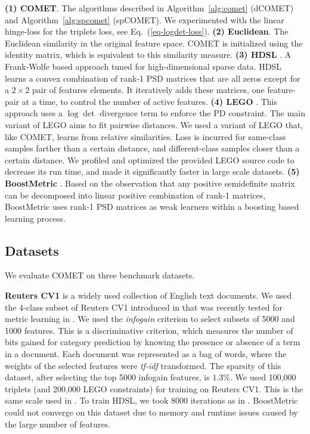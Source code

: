 \documentclass[twoside,11pt]{article}
\renewcommand{\eqref}[1]{Eq.~(\ref{#1})}
\begin{document}
\textbf{(1) COMET}. The algorithms described in Algorithm~\ref{alg:comet} (dCOMET) and Algorithm~\ref{alg:spcomet} (spCOMET). We experimented with the linear hinge-loss for the triplets loss, see \eqref{eq-logdet-loss}. \textbf{(2) Euclidean}. The Euclidean similarity in the original feature space. COMET is initialized using the identity matrix, which is equivalent to this similarity measure.  \textbf{(3) HDSL} \citep{HDSL}. A Frank-Wolfe based approach tuned for high-dimensional sparse data. HDSL learns a convex combination of rank-1 PSD matrices that are all zeros except for a $2\times2$ pair of features elements. It iteratively adds these matrices, one feature-pair at a time, to control the number of active features. \textbf{(4) LEGO} \citep{lego}. This approach uses a $\log \det$ divergence term to enforce the PD constraint. The main variant of LEGO aims to fit pairwise distances. We used a variant of LEGO that, like COMET, learns from relative similarities. Loss is incurred for same-class samples farther than a certain distance, and different-class samples closer than a certain distance. We profiled and optimized the provided LEGO source code to decrease its run time, and made it significantly faster in large scale datasets. \textbf{(5) BoostMetric} \citep{boost}. Based on the observation that any positive semidefinite matrix can be decomposed into linear positive combination of rank-1 matrices, BoostMetric uses rank-1 PSD matrices as weak learners within a boosting based learning process.

\subsection{Datasets}
We evaluate COMET on three benchmark datasets.

\textbf{Reuters CV1} is a widely used collection of English text documents. We used the 4-class subset of Reuters CV1 introduced in \citep{CaiRCV14} that was recently tested for metric learning in \citep{HDSL}. We used the \textit{infogain} criterion \citep{infogain} to select subsets of 5000 and 1000 features. This is a discriminative criterion, which measures the number of bits gained for category prediction by knowing the presence or absence of a term in a document. Each document was represented as a bag of words, where the weights of the selected features were \textit{tf-idf} transformed. The sparsity of this dataset, after selecting the top 5000 infogain features, is $1.3\%$. We used 100,000 triplets (and 200,000 LEGO constraints) for training on Reuters CV1. This is the same scale used in \citet{HDSL}. To train HDSL, we took 8000 iterations as in \citep{HDSL}. BoostMetric could not converge on this dataset due to memory and runtime issues caused by the large number of features.
\end{document}
